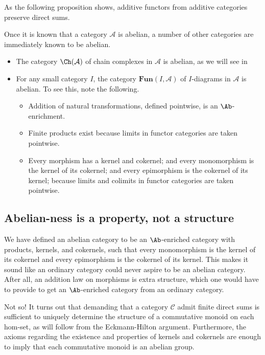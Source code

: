\documentclass[main.tex]{subfiles}
\begin{document}
As the following proposition shows, additive functors from additive categories preserve direct sums.
\begin{example}
  \label{eg:examples_of_abelian_categories}
  Once it is known that a category $\mathcal{A}$ is abelian, a number of other categories are immediately known to be abelian.
  \begin{itemize}
    \item The category $\Ch(\mathcal{A})$ of chain complexes in $\mathcal{A}$ is abelian, as we will see in

    \item For any small category $I$, the category $\mathbf{Fun}(I, \mathcal{A})$ of $I$-diagrams in $\mathcal{A}$ is abelian. To see this, note the following.
      \begin{itemize}
        \item Addition of natural transformations, defined pointwise, is an $\Ab$-enrichment.

        \item Finite products exist because limits in functor categories are taken pointwise.

        \item Every morphism has a kernel and cokernel; and every monomorphism is the kernel of its cokernel; and every epimorphism is the cokernel of its kernel; because limits and colimits in functor categories are taken pointwise.
      \end{itemize}
  \end{itemize}
\end{example}

\subsection{Abelian-ness is a property, not a structure}
\label{ssc:abelian_ness_is_a_property_not_a_structure}

We have defined an abelian category to be an $\Ab$-enriched category with products, kernels, and cokernels, such that every monomorphism is the kernel of its cokernel and every epimorphism is the cokernel of its kernel. This makes it sound like an ordinary category could never aspire to be an abelian category. After all, an addition law on morphisms is extra structure, which one would have to provide to get an $\Ab$-enriched category from an ordinary category.

Not so! It turns out that demanding that a category $\mathcal{C}$ admit finite direct sums is sufficient to uniquely determine the structure of a commutative monoid on each hom-set, as will follow from the Eckmann-Hilton argument. Furthermore, the axioms regarding the existence and properties of kernels and cokernels are enough to imply that each commutative monoid is an abelian group.
\end{document}
